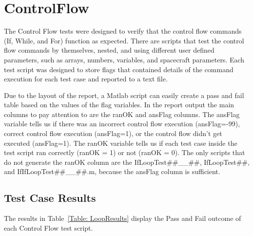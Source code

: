 \chapter{ControlFlow}
\label{Ch:ControlFlow}

The Control Flow tests were designed to verify that the control flow
commands (If, While, and For) function as expected. There are
scripts that test the control flow commands by themselves, nested,
and using different user defined parameters, such as arrays,
numbers, variables, and spacecraft parameters. Each test script was
designed to store flags that contained details of the command
execution for each test case and reported to a text file.

Due to the layout of the report, a Matlab script can easily create a
pass and fail table based on the values of the flag variables. In
the report output the main columns to pay attention to are the ranOK
and ansFlag columns. The ansFlag variable tells us if there was an
incorrect control flow execution (ansFlag=-99), correct control flow
execution (ansFlag=1), or the control flow didn't get executed
(ansFlag=1). The ranOK variable tells us if each test case inside
the test script ran correctly (ranOK = 1) or not (ranOK = 0). The
only scripts that do not generate the ranOK column are the
IfLoopTest\#\#\_\_\#\#, IfLoopTest\#\#, and
IfIfLoopTest\#\#\_\_\#\#.m, because the ansFlag column is
sufficient.

\section{Test Case Results}
The results in Table~\ref{Table: LoopResults} display the Pass and
Fail outcome of each Control Flow test script.


